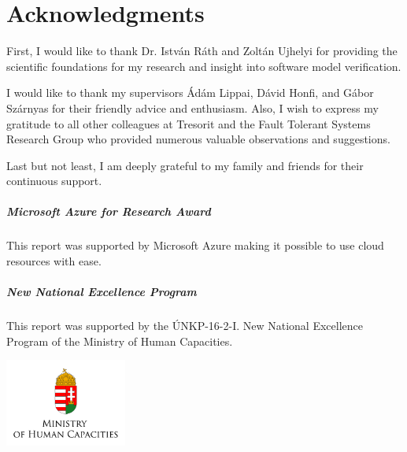 \chapter*{Acknowledgments}
\label{chap:acknowledgments}
\thispagestyle{plain}

First, I would like to thank Dr. István Ráth and Zoltán Ujhelyi for providing the scientific foundations for my research and insight into software model verification.

I would like to thank my supervisors Ádám Lippai, Dávid Honfi, and Gábor Szárnyas for their friendly advice and enthusiasm. Also, I wish to express my gratitude to all other colleagues at Tresorit and the Fault Tolerant Systems Research Group who provided numerous valuable observations and suggestions.

Last but not least, I am deeply grateful to my family and friends for their continuous support.


\vfill

\paragraph{Microsoft Azure for Research Award}
This report was supported by Microsoft Azure making it possible to use cloud resources with ease.

\paragraph{New National Excellence Program}
This report was supported by the ÚNKP-16-2-I. New National Excellence Program of the Ministry of Human Capacities.

\begin{center}
\includegraphics[width=0.3\textwidth]{include/figures/min_en.jpg}
\end{center}
